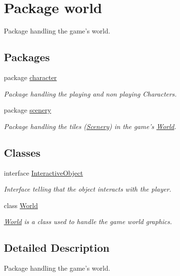 \hypertarget{a00089}{\section{Package world}
\label{a00089}
}


Package handling the game's world.  


\subsection*{Packages}
\begin{DoxyCompactItemize}
\item 
package \hyperlink{a00090}{character}
\begin{DoxyCompactList}\small\item\em Package handling the playing and non playing Characters. \end{DoxyCompactList}\item 
package \hyperlink{a00091}{scenery}
\begin{DoxyCompactList}\small\item\em Package handling the tiles (\hyperlink{a00024}{Scenery}) in the game's \hyperlink{a00039}{World}. \end{DoxyCompactList}\end{DoxyCompactItemize}
\subsection*{Classes}
\begin{DoxyCompactItemize}
\item 
interface \hyperlink{a00014}{Interactive\-Object}
\begin{DoxyCompactList}\small\item\em Interface telling that the object interacts with the player. \end{DoxyCompactList}\item 
class \hyperlink{a00039}{World}
\begin{DoxyCompactList}\small\item\em \hyperlink{a00039}{World} is a class used to handle the game world graphics. \end{DoxyCompactList}\end{DoxyCompactItemize}


\subsection{Detailed Description}
Package handling the game's world. 